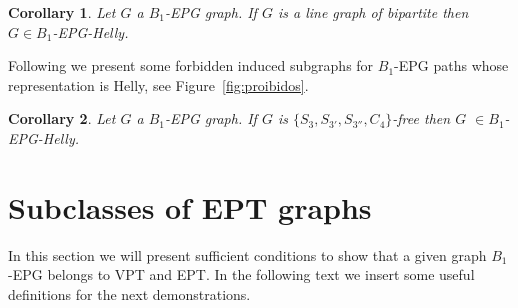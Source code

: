 \documentclass[9pt]{entcs}
\newtheorem{defi}{Definition}[section]
\newtheorem{coro}{Corollary}[section]
\begin{document}
\begin{coro}
Let $G$ a $B_1$-EPG graph. If $G$ is a line graph of bipartite then $G \in B_1$-EPG-Helly. 
\end{coro}



Following we present some forbidden induced subgraphs for $B_1$-EPG paths whose representation is Helly, see Figure~\ref{fig:proibidos}.



\begin{coro}
\label{lem:chordalDiamondFree}
Let $G$ a $B_1$-EPG graph. If $G$ is  $\{S_{3}, S_{3'}, S_{3''}, C_{4}\}$-free then $G$  $\in B_1$-EPG-Helly.
\end{coro}

    


\section{Subclasses of EPT graphs }

In this section we will present sufficient conditions to show that a given graph $B_1$-EPG belongs to VPT and EPT. In the following text we insert some useful definitions for the next demonstrations.
\end{document}
